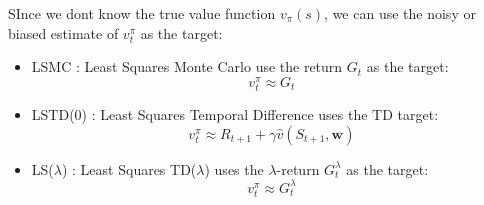 SInce we dont know the true value function \(v_{\pi}(s)\), we can use the noisy or biased estimate of
\(v_t^{\pi}\) as the target:
\begin{itemize}
    \item LSMC : Least Squares Monte Carlo use the return \(G_t\) as the target:
    \[
        v_t^{\pi} \approx  G_t
    \]
    \item LSTD(0) : Least Squares Temporal Difference uses the TD target:
    \[
        v_t^{\pi} \approx R_{t+1} + \gamma \hat{v}(S_{t+1},\mathbf{w})  
    \]
    \item LS(\(\lambda\)) : Least Squares TD(\(\lambda\)) uses the \(\lambda\)-return \(G_t^{\lambda}\) as the
    target:
    \[
        v_t^{\pi} \approx G_t^{\lambda}
    \]
\end{itemize}